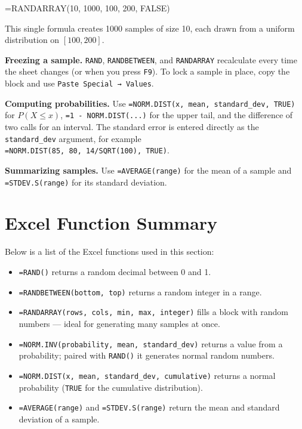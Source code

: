 \documentclass[
  11pt,
  letterpaper,
  DIV=11,
  numbers=noendperiod,
  oneside,
  open=any]{scrreprt}
\newenvironment{Shaded}{\begin{snugshade}}{\end{snugshade}}
\newcommand{\NormalTok}[1]{\textcolor[rgb]{0.00,0.23,0.31}{#1}}
\begin{document}
\begin{Shaded}
\begin{Highlighting}[]
\NormalTok{=RANDARRAY(10, 1000, 100, 200, FALSE)}
\end{Highlighting}
\end{Shaded}

This single formula creates 1000 samples of size 10, each drawn from a
uniform distribution on \([100, 200]\).

\textbf{Freezing a sample.} \texttt{RAND}, \texttt{RANDBETWEEN}, and
\texttt{RANDARRAY} recalculate every time the sheet changes (or when you
press \texttt{F9}). To lock a sample in place, copy the block and use
\texttt{Paste\ Special\ →\ Values}.

\textbf{Computing probabilities.} Use
\texttt{=NORM.DIST(x,\ mean,\ standard\_dev,\ TRUE)} for \(P(X \le x)\),
\texttt{=1\ -\ NORM.DIST(...)} for the upper tail, and the difference of
two calls for an interval. The standard error is entered directly as the
\texttt{standard\_dev} argument, for example
\texttt{=NORM.DIST(85,\ 80,\ 14/SQRT(100),\ TRUE)}.

\textbf{Summarizing samples.} Use \texttt{=AVERAGE(range)} for the mean
of a sample and \texttt{=STDEV.S(range)} for its standard deviation.

\section{Excel Function Summary}\label{excel-function-summary-8}

Below is a list of the Excel functions used in this section:

\begin{itemize}
\item
  \texttt{=RAND()} returns a random decimal between 0 and 1.
\item
  \texttt{=RANDBETWEEN(bottom,\ top)} returns a random integer in a
  range.
\item
  \texttt{=RANDARRAY(rows,\ cols,\ min,\ max,\ integer)} fills a block
  with random numbers --- ideal for generating many samples at once.
\item
  \texttt{=NORM.INV(probability,\ mean,\ standard\_dev)} returns a value
  from a probability; paired with \texttt{RAND()} it generates normal
  random numbers.
\item
  \texttt{=NORM.DIST(x,\ mean,\ standard\_dev,\ cumulative)} returns a
  normal probability (\texttt{TRUE} for the cumulative distribution).
\item
  \texttt{=AVERAGE(range)} and \texttt{=STDEV.S(range)} return the mean
  and standard deviation of a sample.
\end{itemize}
\end{document}
